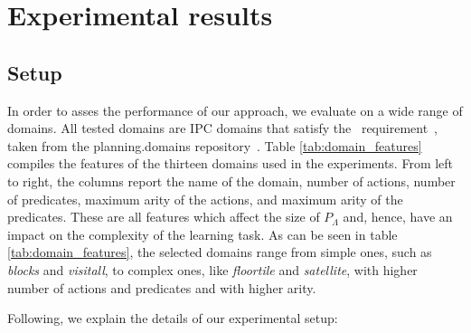 
\section{Experimental results}
\label{sec:experiments}

\subsection{Setup}
In order to asses the performance of our approach, we evaluate \FAMA on a wide range of domains. All tested domains are IPC domains that satisfy the \strips\ requirement~\cite{fox2003pddl2}, taken from the {\sc planning.domains} repository~\cite{muise2016planning}. Table \ref{tab:domain_features} compiles the features of the thirteen domains used in the experiments. From left to right, the columns report the name of the domain, number of actions, number of predicates, maximum arity of the actions, and maximum arity of the predicates. These are all features which affect the size of $P_\Lambda$ and, hence, have an impact on the complexity of the learning task. As can be seen in table \ref{tab:domain_features}, the selected domains range from simple ones, such as \emph{blocks} and \emph{visitall}, to complex ones, like \emph{floortile} and \emph{satellite}, with higher number of actions and predicates and with higher arity.

Following, we explain the details of our experimental setup:

